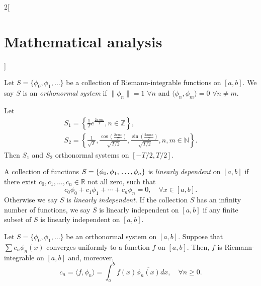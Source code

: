 \documentclass[class=article,crop=false]{standalone}
\begin{document}
\begin{multicols}{2}[\section{Mathematical analysis}]
\begin{definition}
\end{definition}
\begin{definition}
Let $S=\{\phi_0,\phi_1,\ldots\}$ be a collection of Riemann-integrable functions on $[a,b]$. We say $S$ is an \textit{orthonormal system} if $\|\phi_n\|=1$ $\forall n$ and $\langle\phi_n,\phi_m\rangle=0$ $\forall n\ne m$.
\end{definition}
\begin{prop}
Let \begin{gather*}
    S_1=\left\{\frac{1}{T}e^{\frac{2\pi inx}{T}},n\in\mathbb{Z}\right\},\\ S_2=\left\{\frac{1}{\sqrt{T}},\frac{\cos\left(\frac{2\pi nx}{T}\right)}{\sqrt{T/2}},\frac{\sin\left(\frac{2\pi mx}{T}\right)}{\sqrt{T/2}},n,m\in\mathbb{N}\right\}.
\end{gather*} Then $S_1$ and $S_2$ orthonormal systems on $[-T/2,T/2]$.
\end{prop}
\begin{definition}
A collection of functions $S=\{\phi_0,\phi_1,\\\ldots,\phi_n\}$ is \textit{linearly dependent} on $[a,b]$ if there exist $c_0,c_1,\ldots,c_n\in\mathbb{R}$ not all zero, such that $$c_0\phi_0+c_1\phi_1+\cdots+c_n\phi_n=0,\quad\forall x\in[a,b].$$ Otherwise we say $S$ is \textit{linearly independent}. If the collection $S$ has an infinity number of functions, we say $S$ is linearly independent on $[a,b]$ if any finite subset of $S$ is linearly independent on $[a,b]$.
\end{definition}
\begin{theorem}
Let $S=\{\phi_0,\phi_1,\ldots\}$ be an orthonormal system on $[a,b]$. Suppose that $\sum c_n\phi_n(x)$ converges uniformly to a function $f$ on $[a,b]$. Then, $f$ is Riemann-integrable on $[a,b]$ and, moreover, $$c_n=\langle f,\phi_n\rangle=\int_a^bf(x)\overline{\phi_n(x)}dx,\quad\forall n\geq 0.$$
\end{theorem}

\end{multicols}
\end{document}
